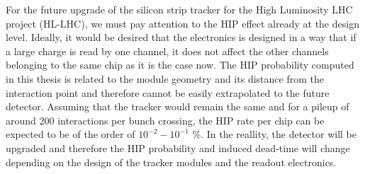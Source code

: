 

For the future upgrade of the silicon strip tracker for the High Luminosity LHC project (HL-LHC), we must pay attention to the HIP effect already at the design level. Ideally, it would be desired that the electronics is designed in a way that if a large charge is read by one channel, it does not affect the other channels belonging to the same chip as it is the case now. The HIP probability computed in this thesis is related to the module geometry and its distance from the interaction point and therefore cannot be easily extrapolated to the future detector. Assuming that the tracker would remain the same and for a pileup of around 200 interactions per bunch crossing, the HIP rate per chip can be expected to be of the order of $10^{-2}-10^{-1}$ \%. In the reallity, the detector will be upgraded and therefore the HIP probability and induced dead-time will change depending on the design of the tracker modules and the readout electronics.

